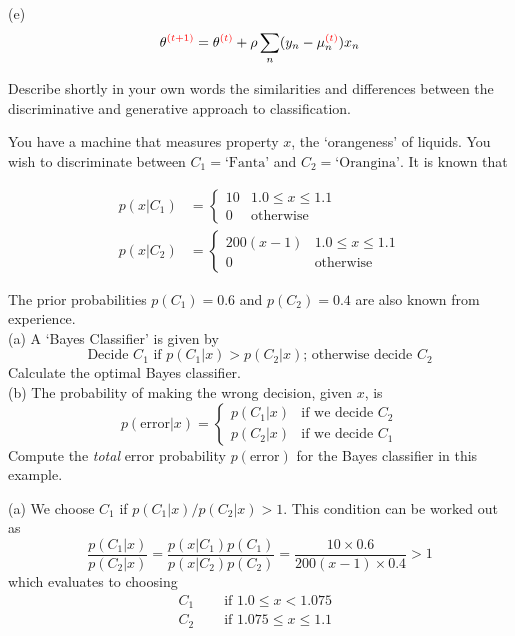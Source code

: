 \documentclass[a4paper]{article}
\def\r#1{{\color{red}#1}}
\begin{document}
\begin{ExerciseList}
(e)
$$ \theta^{\r{(t+1)}} = \theta^{\r{(t)}} + \rho \sum_n (y_n - \mu_n^{\r{(t)}})x_n$$


\Exercise[label={ex:discr-gen}] Describe shortly in your own words the similarities and differences between the discriminative and generative approach to classification.


\Exercise[label={ex:orangeness}] You have a machine that measures property $x$, the `orangeness' of liquids. You wish
to discriminate between $C_1 = \text{`Fanta'}$ and $C_2 = \text{`Orangina'}$. It is known that

\begin{align*}
p(x|C_1) &= \begin{cases} 10 & 1.0 \leq x \leq 1.1\\
    0 & \text{otherwise}
    \end{cases}\\
p(x|C_2) &= \begin{cases} 200(x - 1) & 1.0 \leq x \leq 1.1\\
0 & \text{otherwise}
\end{cases}
\end{align*}

The prior probabilities $p(C_1) = 0.6$ and $p(C_2) = 0.4$ are also known from experience.\\
(a) A `Bayes Classifier' is given by
$$ \text{Decide $C_1$ if $p(C_1|x)>p(C_2|x)$; otherwise decide $C_2$}$$
Calculate the optimal Bayes classifier.\\
(b) The probability of making the wrong decision, given $x$, is
\begin{equation}
p(\text{error}|x)= \begin{cases} p(C_1|x) & \text{if we decide $C_2$}\\
    p(C_2|x) & \text{if we decide $C_1$}
\end{cases}
\label{eq:p(error|x)}
\end{equation}
Compute the \emph{total} error probability  $p(\text{error})$ for the Bayes classifier in this example.

\Answer[ref={ex:orangeness}]
(a) We choose $C_1$ if $p(C_1|x)/p(C_2|x) > 1$. This condition can be worked out as
$$
\frac{p(C_1|x)}{p(C_2|x)} = \frac{p(x|C_1)p(C_1)}{p(x|C_2)p(C_2)} = \frac{10 \times 0.6}{200(x-1)\times 0.4}>1
$$
which evaluates to choosing
\begin{align*}
C_1 &\quad \text{ if $1.0\leq x < 1.075$}\\ C_2 &\quad \text{ if $1.075 \leq x \leq 1.1$ }
\end{align*}


\end{ExerciseList}
\end{document}
